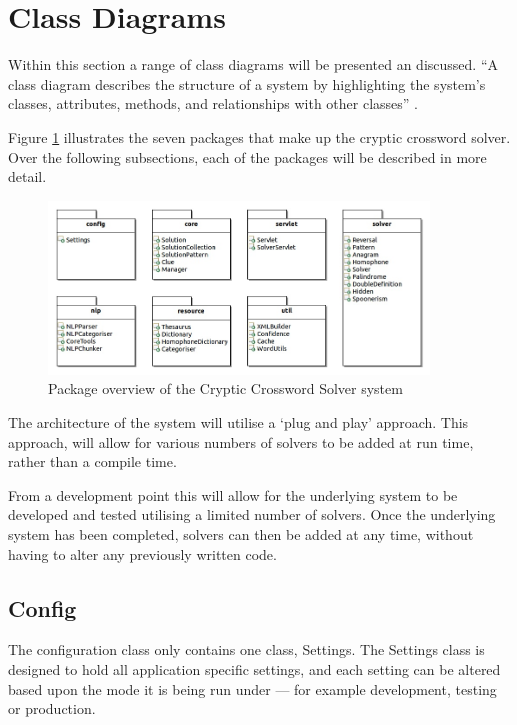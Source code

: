 \section{Class Diagrams}
\label{sec:class_diagram}

Within this section a range of class diagrams will be presented an discussed. 
``A class diagram describes the structure of a system by highlighting the 
system's classes, attributes, methods, and relationships with other classes''
\citep{lunn03}.

Figure \ref{fig:package_overview} illustrates the seven packages that make up 
the cryptic crossword solver. Over the following subsections, each of the 
packages will be described in more detail.

\begin{figure}[H]
  \centering
  \includegraphics[width=0.9\textwidth]{class/package_layout.jpg}
  \caption{Package overview of the Cryptic Crossword Solver system}
  \label{fig:package_overview}
\end{figure}

The architecture of the system will utilise a `plug and play' approach. This 
approach, will allow for various numbers of solvers to be added at run time, 
rather than a compile time.

From a development point this will allow for the underlying system to be 
developed and tested utilising a limited number of solvers. Once the underlying 
system has been completed, solvers can then be added at any time, without having 
to alter any previously written code.


\subsection{Config}
\label{sub:config}

The configuration class only contains one class, Settings. The Settings class is 
designed to hold all application specific settings, and each setting can be 
altered based upon the mode it is being run under --- for example development, 
testing or production.

